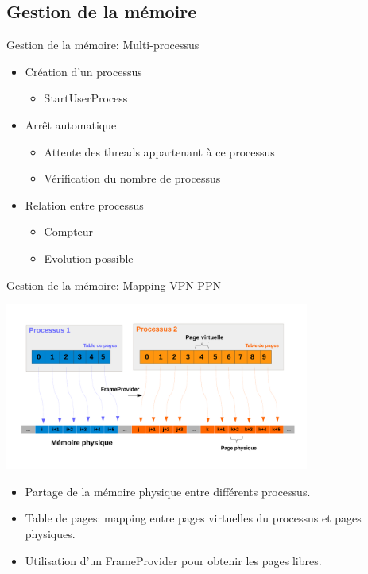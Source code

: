 \documentclass{beamer}
\begin{document}
\subsection{Gestion de la mémoire}
\begin{frame}{Gestion de la mémoire: Multi-processus}
    \begin{itemize}

        \item Création d'un processus
 		\begin{itemize}
 			\item StartUserProcess
 		\end{itemize}
        \item Arrêt automatique
        \begin{itemize}
 			\item Attente des threads appartenant à ce processus
 			\item Vérification du nombre de processus
 		\end{itemize}
        \item Relation entre processus
        \begin{itemize}
 			\item Compteur
 			\item Evolution possible
 		\end{itemize}
    \end{itemize}
\end{frame}

\begin{frame}{Gestion de la mémoire: Mapping VPN-PPN}
	 \begin{center}
			\includegraphics[width=10cm]{schema_memoire.pdf}
	\end{center}
	\begin{itemize}
        \item Partage de la mémoire physique entre différents processus.
        \item Table de pages: mapping entre pages virtuelles du processus et pages physiques.
        \item Utilisation d'un FrameProvider pour obtenir les pages libres.
    \end{itemize}
\end{frame}
\end{document}
